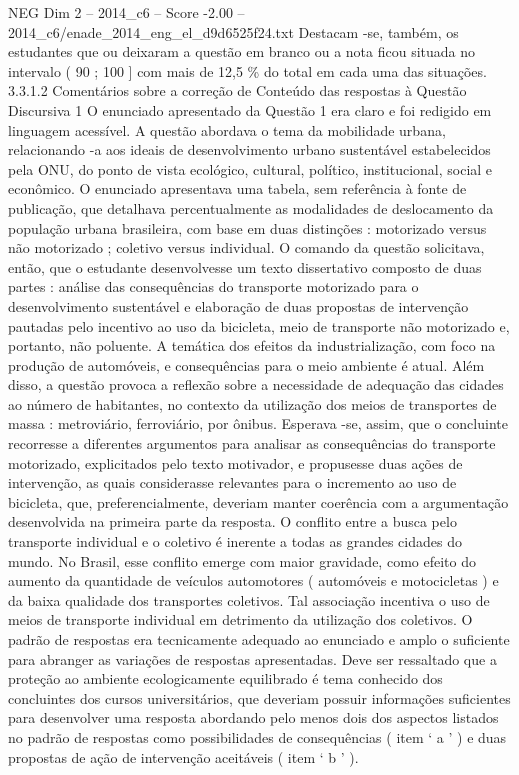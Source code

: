 \begin{textsample}{NEG Dim 2 – 2014\_c6 – Score -2.00 – 2014\_c6/enade\_2014\_eng\_el\_d9d6525f24.txt}
Destacam -se, também, os estudantes que ou deixaram a questão em branco ou a nota ficou situada no intervalo ( 90 ; 100 ] com mais de 12,5 \% do total em cada uma das situações. 3.3.1.2 Comentários sobre a correção de Conteúdo das respostas à Questão Discursiva 1 O enunciado apresentado da Questão 1 era claro e foi redigido em linguagem acessível.
A questão abordava o tema da mobilidade urbana, relacionando -a aos ideais de desenvolvimento urbano sustentável estabelecidos pela ONU, do ponto de vista ecológico, cultural, político, institucional, social e econômico.
O enunciado apresentava uma tabela, sem referência à fonte de publicação, que detalhava percentualmente as modalidades de deslocamento da população urbana brasileira, com base em duas distinções : motorizado versus não motorizado ; coletivo versus individual.
O comando da questão solicitava, então, que o estudante desenvolvesse um texto dissertativo composto de duas partes : análise das consequências do transporte motorizado para o desenvolvimento sustentável e elaboração de duas propostas de intervenção pautadas pelo incentivo ao uso da bicicleta, meio de transporte não motorizado e, portanto, não poluente.
A temática dos efeitos da industrialização, com foco na produção de automóveis, e consequências para o meio ambiente é atual.
Além disso, a questão provoca a reflexão sobre a necessidade de adequação das cidades ao número de habitantes, no contexto da utilização dos meios de transportes de massa : metroviário, ferroviário, por ônibus.
Esperava -se, assim, que o concluinte recorresse a diferentes argumentos para analisar as consequências do transporte motorizado, explicitados pelo texto motivador, e propusesse duas ações de intervenção, as quais considerasse relevantes para o incremento ao uso de bicicleta, que, preferencialmente, deveriam manter coerência com a argumentação desenvolvida na primeira parte da resposta.
O conflito entre a busca pelo transporte individual e o coletivo é inerente a todas as grandes cidades do mundo.
No Brasil, esse conflito emerge com maior gravidade, como efeito do aumento da quantidade de veículos automotores ( automóveis e motocicletas ) e da baixa qualidade dos transportes coletivos.
Tal associação incentiva o uso de meios de transporte individual em detrimento da utilização dos coletivos.
O padrão de respostas era tecnicamente adequado ao enunciado e amplo o suficiente para abranger as variações de respostas apresentadas.
Deve ser ressaltado que a proteção ao ambiente ecologicamente equilibrado é tema conhecido dos concluintes dos cursos universitários, que deveriam possuir informações suficientes para desenvolver uma resposta abordando pelo menos dois dos aspectos listados no padrão de respostas como possibilidades de consequências ( item ‘ a ’ ) e duas propostas de ação de intervenção aceitáveis ( item ‘ b ’ ).

\end{textsample}
